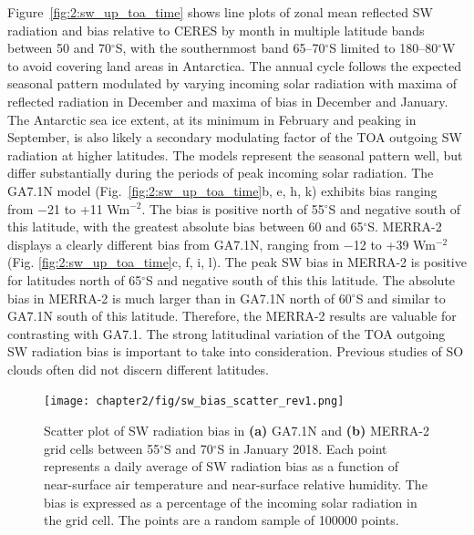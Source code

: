 Figure~\ref{fig:2:sw_up_toa_time} shows line plots of zonal mean reflected SW
radiation and bias relative to CERES by month in multiple latitude bands
between 50 and 70$^\circ$S, with the southernmost band 65--70$^\circ$S limited
to 180--80$^\circ$W to avoid covering land areas in Antarctica. The annual
cycle follows the expected seasonal pattern modulated by varying incoming solar
radiation with maxima of reflected radiation in December and maxima of bias in
December and January. The Antarctic sea ice extent, at its minimum in February
and peaking in September, is also likely a secondary modulating factor of the
TOA outgoing SW radiation at higher latitudes. The models represent the
seasonal pattern well, but differ substantially during the periods of peak
incoming solar radiation. The GA7.1N model (Fig.~\ref{fig:2:sw_up_toa_time}b, e,
h, k) exhibits bias ranging from $-$21 to +11 Wm$^{-2}$. The bias is positive
north of 55$^\circ$S and negative south of this latitude, with the greatest
absolute bias between 60 and 65$^\circ$S. MERRA-2 displays a clearly different
bias from GA7.1N, ranging from $-$12 to +39 Wm$^{-2}$ (Fig.
\ref{fig:2:sw_up_toa_time}c, f, i, l). The peak SW bias in MERRA-2 is positive for
latitudes north of 65$^\circ$S and negative south of this this latitude. The
absolute bias in MERRA-2 is much larger than in GA7.1N north of 60$^\circ$S and
similar to GA7.1N south of this latitude. Therefore, the MERRA-2 results are
valuable for contrasting with GA7.1. The strong latitudinal variation of the
TOA outgoing SW radiation bias is important to take into consideration.
Previous studies of SO clouds often did not discern different latitudes.

\begin{figure}[t]
\centering
\centerline{\texttt{[image: chapter2/fig/sw\_bias\_scatter\_rev1.png]}}
\caption[Scatter plot of SW radiation bias in GA7.1N and MERRA-2]{
Scatter plot of SW radiation bias in \textbf{(a)} GA7.1N and \textbf{(b)} MERRA-2 grid cells
between 55$^\circ$S and 70$^\circ$S in January 2018. Each point represents a
daily average of SW radiation bias as a function of near-surface air temperature
and near-surface relative humidity. The bias is expressed as a percentage of the
incoming solar radiation in the grid cell. The points are a random sample of
100000 points.
}
\label{fig:2:sw-bias-scatter}
\end{figure}

